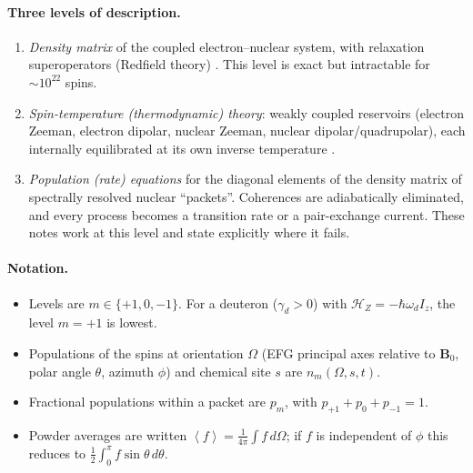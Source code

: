 \documentclass[11pt]{article}
\newcommand{\avg}[1]{\left\langle #1\right\rangle}
\begin{document}
\paragraph{Three levels of description.}
\begin{enumerate}
\item \emph{Density matrix} of the coupled electron--nuclear system, with relaxation
superoperators (Redfield theory) \cite{Abragam1961,Slichter1990}. This level is exact but
intractable for $\sim 10^{22}$ spins.
\item \emph{Spin-temperature (thermodynamic) theory}: weakly coupled reservoirs (electron
Zeeman, electron dipolar, nuclear Zeeman, nuclear dipolar/quadrupolar), each internally
equilibrated at its own inverse temperature
\cite{Provotorov1962,Goldman1970,AbragamGoldman1978,AbragamGoldman1982}.
\item \emph{Population (rate) equations} for the diagonal elements of the density matrix of
spectrally resolved nuclear ``packets''. Coherences are adiabatically eliminated, and every
process becomes a transition rate or a pair-exchange current. These notes work at this level
and state explicitly where it fails.
\end{enumerate}

\paragraph{Notation.}
\begin{itemize}
\item Levels are $m\in\{+1,0,-1\}$. For a deuteron ($\gamma_d>0$) with
$\mathcal H_Z=-\hbar\omega_d I_z$, the level $m=+1$ is lowest.
\item Populations of the spins at orientation $\Omega$ (EFG principal axes relative to
$\mathbf B_0$, polar angle $\theta$, azimuth $\phi$) and chemical site $s$ are
$n_m(\Omega,s,t)$.
\item Fractional populations within a packet are $p_m$, with $p_{+1}+p_0+p_{-1}=1$.
\item Powder averages are written
$\avg{f}=\frac{1}{4\pi}\int f\,d\Omega$; if $f$ is independent of $\phi$ this reduces to
$\tfrac12\int_0^\pi f\sin\theta\,d\theta$.
\end{itemize}
\end{document}
